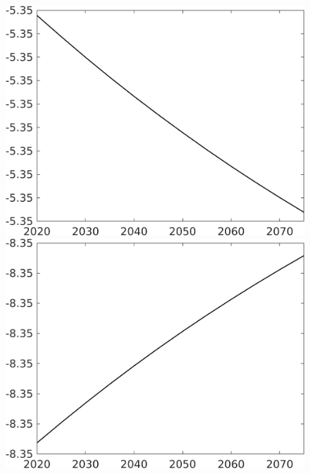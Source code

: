 \documentclass[12pt]{article}
\begin{document}
\begin{figure}[h!!]
\begin{minipage}[]{0.32\textwidth}
	\end{minipage}	
	\begin{minipage}[]{0.32\textwidth}
		\includegraphics[width=1\textwidth]{../../codding_model/own_basedOnFried/optimalPol_010922_revision/figures/all_13Sept22/CompTaul_LFBAUPer_Reg0_hl_spillover0_nsk0_xgr1_knspil0_sep1_countec0_GovRev0_etaa0.79.png}
	\end{minipage}	
	\begin{minipage}[]{0.32\textwidth}
		\includegraphics[width=1\textwidth]{../../codding_model/own_basedOnFried/optimalPol_010922_revision/figures/all_13Sept22/CompTaul_LFBAUPer_Reg0_C_spillover0_nsk0_xgr1_knspil0_sep1_countec0_GovRev0_etaa0.79.png}

\end{minipage}
\end{figure}
\end{document}
